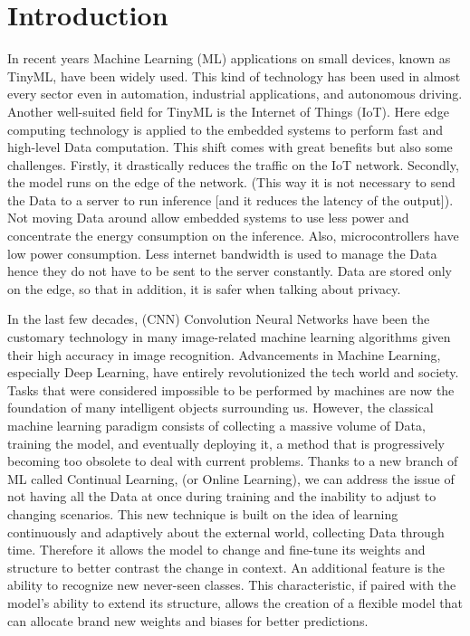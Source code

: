 \chapter{Introduction}
\label{cha:introduction}

\quad In recent years Machine Learning (ML) applications on small devices, known as TinyML, have been widely used. This kind of technology has been used in almost every sector even in automation, industrial applications, and autonomous driving. Another well-suited field for TinyML is the Internet of Things (IoT). Here edge computing technology is applied to the embedded systems to perform fast and high-level Data computation. This shift comes with great benefits but also some challenges. Firstly, it drastically reduces the traffic on the IoT network. Secondly, the model runs on the edge of the network. (This way it is not necessary to send the Data to a server to run inference [and it reduces the latency of the output]). Not moving Data around allow embedded systems to use less power and concentrate the energy consumption on the inference. Also, microcontrollers have low power consumption. Less internet bandwidth is used to manage the Data hence they do not have to be sent to the server constantly. Data are stored only on the edge, so that in addition, it is safer when talking about privacy.

\quad In the last few decades, (CNN) Convolution Neural Networks have been the customary technology in many image-related machine learning algorithms given their high accuracy in image recognition.
Advancements in Machine Learning, especially Deep Learning, have entirely revolutionized the tech world and society. Tasks that were considered impossible to be performed by machines are now the foundation of many intelligent objects surrounding us. However, the classical machine learning paradigm consists of collecting a massive volume of Data, training the model, and eventually deploying it, a method that is progressively becoming too obsolete to deal with current problems. Thanks to a new branch of ML called Continual Learning, (or Online Learning), we can address the issue of not having all the Data at once during training and the inability to adjust to changing scenarios. This new technique is built on the idea of learning continuously and adaptively about the external world, collecting Data through time. Therefore it allows the model to change and fine-tune its weights and structure to better contrast the change in context. An additional feature is the ability to recognize new never-seen classes. This characteristic, if paired with the model's ability to extend its structure, allows the creation of a flexible model that can allocate brand new weights and biases for better predictions.


